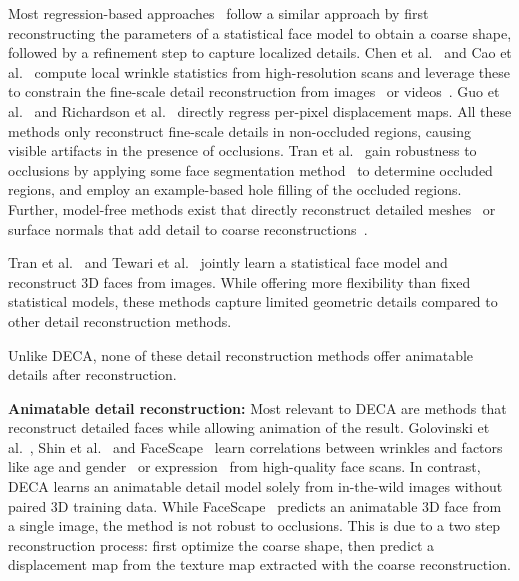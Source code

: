 \documentclass[final]{cvpr}
\newcommand{\qheading}[1]{\noindent\textbf{#1}}
\newcommand{\modelname}{DECA\xspace}
\begin{document}
Most regression-based approaches~\cite{Cao2015,Chen2019,Guo2018,Richardson2017,AnhTran2018} follow a similar approach by first reconstructing the parameters of a statistical face model to obtain a coarse shape, followed by a refinement step to capture localized details.
Chen et al.~\cite{Chen2019} and Cao et al.~\cite{Cao2015}  compute local wrinkle statistics from high-resolution scans and leverage these to constrain the fine-scale detail reconstruction from images~\cite{Chen2019} or videos~\cite{Cao2015}.
Guo et al.~\cite{Guo2018} and Richardson et al.~\cite{Richardson2017} directly regress per-pixel displacement maps.
All these methods only reconstruct fine-scale details in non-occluded regions, causing visible artifacts in the presence of occlusions. 
Tran et al.~\cite{AnhTran2018} gain robustness to occlusions by applying some face segmentation method~\cite{Nirkin2018} to determine occluded regions, and employ an example-based hole filling of the occluded regions. 
Further, model-free methods exist that directly reconstruct detailed meshes~\cite{Sela2017,Zeng2019} or surface normals that add detail to coarse reconstructions~\cite{Abrevaya2020,Sengupta2018}.

Tran et al.~\cite{LuanTran2019} and Tewari et al.~\cite{Tewari2019,Tewari2018} jointly learn a statistical face model and reconstruct 3D faces from images. 
While offering more flexibility than fixed statistical models, these methods capture limited geometric details compared to other detail reconstruction methods. 

Unlike \modelname, none of these detail reconstruction methods offer animatable details after reconstruction.

\qheading{Animatable detail reconstruction:}
Most relevant to \modelname are methods that reconstruct detailed faces while allowing animation of the result.
Golovinski et al.~\cite{Golovinskiy2006}, Shin et al.~\cite{Shin2014} and FaceScape~\cite{yang2020facescape} learn correlations between wrinkles and factors like age and gender~\cite{Golovinskiy2006} or expression~\cite{Shin2014,yang2020facescape} from high-quality face scans. 
In contrast, \modelname learns an animatable detail model solely from in-the-wild images without paired 3D training data.
While FaceScape~\cite{yang2020facescape} predicts an animatable 3D face from a single image, the method is not robust to occlusions.
This is due to a two step reconstruction process: first optimize the coarse shape, then predict a displacement map from the texture map extracted with the coarse reconstruction.
\end{document}
